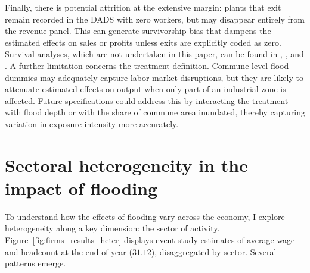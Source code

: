 


Finally, there is potential attrition at the extensive margin: plants that exit remain recorded in the DADS with zero workers, but may disappear entirely from the revenue panel. This can generate survivorship bias that dampens the estimated effects on sales or profits unless exits are explicitly coded as zero. Survival analyses, which are not undertaken in this paper, can be found in \cite{erda2024disasters}, \cite{fatica2024floods}, and \cite{clo2024impact}. A further limitation concerns the treatment definition. Commune-level flood dummies may adequately capture labor market disruptions, but they are likely to attenuate estimated effects on output when only part of an industrial zone is affected. Future specifications could address this by interacting the treatment with flood depth or with the share of commune area inundated, thereby capturing variation in exposure intensity more accurately.


\section{Sectoral heterogeneity in the impact of flooding}

To understand how the effects of flooding vary across the economy, I explore heterogeneity along a key dimension: the sector of activity. Figure~\ref{fig:firms_results_heter} displays event study estimates of average wage and headcount at the end of year ($31.12$), disaggregated by sector. Several patterns emerge.

